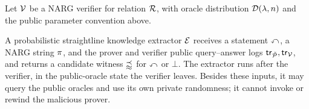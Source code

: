 \begin{definition}
  \label{def:adaptive_narg_knowledge_soundness}
  Let \(\mathcal{V}\) be a NARG verifier for relation \(\mathcal{R}\), with oracle distribution \(\mathcal{D}(\lambda,n)\) and the public parameter convention above.

  A probabilistic straightline knowledge extractor \(\mathcal E\) receives a statement \(\mathbb{x}\), a NARG string \(\pi\), and the prover and verifier public query--answer logs \(\mathsf{tr}_{\tilde{\mathcal{P}}},\mathsf{tr}_{\mathcal{V}}\), and returns a candidate witness \(\mathbb{w}\) for \(\mathbb{x}\) or \(\bot\). The extractor runs after the verifier, in the public-oracle state the verifier leaves. Besides these inputs, it may query the public oracles and use its own private randomness; it cannot invoke or rewind the malicious prover.


\end{definition}
